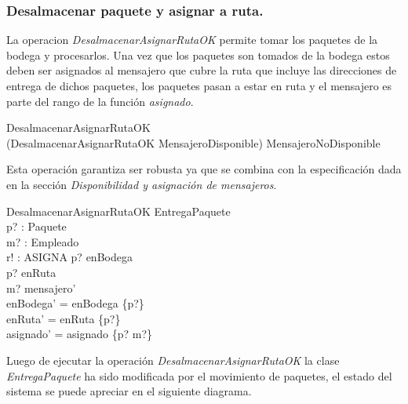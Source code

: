 \documentclass[12pt,a4paper,zed]{article}
\renewcommand*{\defs}{\mathrel{\widehat{=}}}
\begin{document}
\subsubsection{Desalmacenar paquete y asignar a ruta.}

La operacion \textit{DesalmacenarAsignarRutaOK} permite tomar los paquetes de la bodega y procesarlos. Una vez que los paquetes son tomados de la bodega estos deben ser asignados al mensajero que cubre la ruta que incluye las direcciones de entrega de dichos paquetes, los paquetes pasan a estar en ruta y el mensajero es parte del rango de la función \textit{asignado}.

\begin{zed}
DesalmacenarAsignarRutaOK\defs\\
(DesalmacenarAsignarRutaOK \wedge MensajeroDisponible)
\vee MensajeroNoDisponible
\end{zed}

Esta operación garantiza ser robusta ya que se combina con la especificación dada en la sección \textit{Disponibilidad y asignación de mensajeros}.

\begin{schema}{DesalmacenarAsignarRutaOK}
\Delta EntregaPaquete\\
p? : Paquete\\
m? : Empleado\\
r! : ASIGNA
\where
p? \in enBodega\\
p? \notin  enRuta\\
m? \in mensajero'\\
enBodega' = enBodega \setminus \{p?\}\\
enRuta' = enRuta \cup \{p?\}\\
asignado' = asignado \cup \{p? \mapsto m?\}
\end{schema}

Luego de ejecutar la operación \textit{DesalmacenarAsignarRutaOK} la clase \textit{EntregaPaquete} ha sido modificada por el movimiento de paquetes, el estado del sistema se puede apreciar en el siguiente diagrama.
\end{document}
